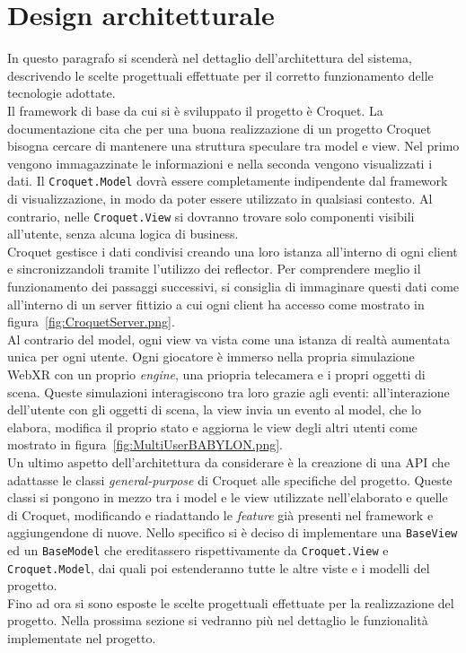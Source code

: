 \section{Design architetturale}\label{sec:design}
In questo paragrafo si scenderà nel dettaglio dell'architettura del sistema, descrivendo le scelte progettuali effettuate per il corretto funzionamento delle tecnologie adottate.\\
\newline
Il framework di base da cui si è sviluppato il progetto è Croquet. La documentazione cita che per una buona realizzazione di un progetto Croquet bisogna cercare di mantenere una 
struttura speculare tra model e view. Nel primo vengono immagazzinate le informazioni e nella seconda vengono visualizzati i dati. Il \texttt{Croquet.Model} dovrà essere 
completamente indipendente dal framework di visualizzazione, in modo da poter essere utilizzato in qualsiasi contesto. Al contrario, nelle
\texttt{Croquet.View} si dovranno trovare solo componenti visibili all'utente, senza alcuna logica di business.\\
Croquet gestisce i dati condivisi creando una loro istanza all'interno di ogni client e sincronizzandoli tramite l'utilizzo dei reflector. Per comprendere meglio il funzionamento
dei passaggi successivi, si consiglia di immaginare questi dati come all'interno di un server fittizio a cui ogni client ha accesso come mostrato in figura~\ref{fig:CroquetServer.png}.\\
Al contrario del model, ogni view va vista come una istanza di realtà aumentata unica per ogni utente. Ogni giocatore è immerso nella propria simulazione WebXR con un proprio 
\textit{engine}, una priopria telecamera e i propri oggetti di scena. Queste simulazioni interagiscono tra loro grazie agli eventi: all'interazione dell'utente con gli oggetti di scena,
la view invia un evento al model, che lo elabora, modifica il proprio stato e aggiorna le view degli altri utenti come mostrato in figura~\ref{fig:MultiUserBABYLON.png}.\\
\newline
Un ultimo aspetto dell'architettura da considerare è la creazione di una API che adattasse le classi \textit{general-purpose} di Croquet alle specifiche del progetto. Queste classi si pongono
in mezzo tra i model e le view utilizzate nell'elaborato e quelle di Croquet, modificando e riadattando le \textit{feature} già presenti nel framework e aggiungendone di nuove. 
Nello specifico si è deciso di implementare una \texttt{BaseView} ed un \texttt{BaseModel} che ereditassero rispettivamente da \texttt{Croquet.View} e \texttt{Croquet.Model}, dai 
quali poi estenderanno tutte le altre viste e i modelli del progetto.\\
\newline
Fino ad ora si sono esposte le scelte progettuali effettuate per la realizzazione del progetto. Nella prossima sezione si vedranno più nel dettaglio le funzionalità implementate
nel progetto.